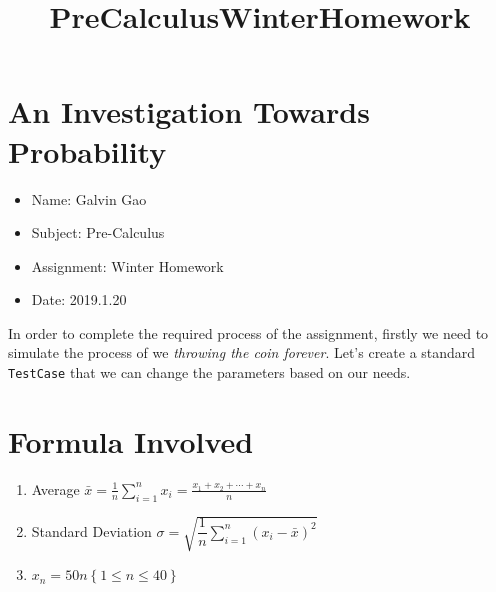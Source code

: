 \documentclass{article}
\title{PreCalculusWinterHomework}
\providecommand{\tightlist}{%
      \setlength{\itemsep}{0pt}\setlength{\parskip}{0pt}}
\begin{document}
    
    
    \maketitle
    
    

    
    \section{An Investigation Towards
Probability}\label{an-investigation-towards-probability}

\begin{itemize}
\tightlist
\item
  Name: Galvin Gao
\item
  Subject: Pre-Calculus
\item
  Assignment: Winter Homework
\item
  Date: 2019.1.20
\end{itemize}

In order to complete the required process of the assignment, firstly we
need to simulate the process of we \emph{throwing the coin forever}.
Let's create a standard \texttt{TestCase} that we can change the
parameters based on our needs.

    \section{Formula Involved}\label{formula-involved}

\begin{enumerate}
\def\labelenumi{\arabic{enumi}.}
\item
  Average
  \({\displaystyle \bar{x} ={\frac {1}{n}}\sum _{i=1}^{n}x_{i}={\frac {x_{1}+x_{2}+\cdots +x_{n}}{n}}}\)
\item
  Standard Deviation
  \({\sigma = \sqrt{\dfrac{1}{n} \displaystyle\sum ^{n}_{i=1} \left(x_{i} - \bar{x} \right) ^{2}}}\)
\item
  \(x_n = 50n \left\{1 \leq n \leq 40 \right\}\)
\end{enumerate}
\end{document}

